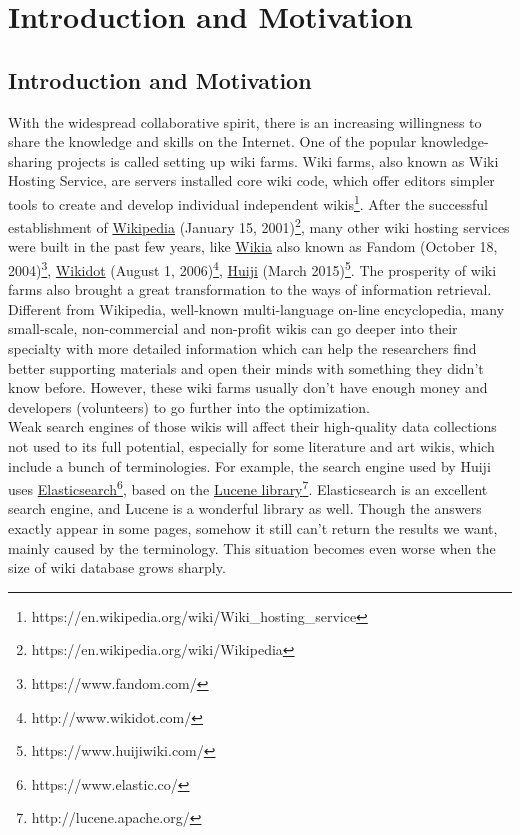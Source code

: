 \chapter{Introduction and Motivation}
\label{Ch-1:Sec:Introduction}
\section{Introduction and Motivation}
\vspace{-5pt}
With the widespread collaborative spirit, there is an increasing willingness to share the knowledge and skills on the Internet. One of the popular knowledge-sharing projects is called setting up wiki farms. Wiki farms, also known as Wiki Hosting Service, are servers installed core wiki code, which offer editors simpler tools to create and develop individual independent wikis\footnote{https://en.wikipedia.org/wiki/Wiki\_hosting\_service}. After the successful establishment of \href{https://en.wikipedia.org/wiki/Wikipedia}{Wikipedia} (January 15, 2001)\footnote{https://en.wikipedia.org/wiki/Wikipedia}, many other wiki hosting services were built in the past few years, like \href{https://www.fandom.com/}{Wikia} also known as Fandom (October 18, 2004)\footnote{https://www.fandom.com/}, \href{http://www.wikidot.com/}{Wikidot} (August 1, 2006)\footnote{http://www.wikidot.com/}, \href{https://www.huijiwiki.com/}{Huiji} (March 2015)\footnote{https://www.huijiwiki.com/}. The prosperity of wiki farms also brought a great transformation to the ways of information retrieval.\\
\indent Different from Wikipedia, well-known multi-language on-line encyclopedia, many small-scale, non-commercial and non-profit wikis can go deeper into their specialty with more detailed information which can help the researchers find better supporting materials and open their minds with something they didn't know before. However, these wiki farms usually don't have enough money and developers (volunteers) to go further into the optimization.\\
\indent Weak search engines of those wikis will affect their high-quality data collections not used to its full potential, especially for some literature and art wikis, which include a bunch of terminologies. For example, the search engine used by Huiji uses \href{https://www.elastic.co/}{Elasticsearch}\footnote{https://www.elastic.co/}, based on the \href{http://lucene.apache.org/}{Lucene library}\footnote{http://lucene.apache.org/}. Elasticsearch is an excellent search engine, and Lucene is a wonderful library as well. Though the answers exactly appear in some pages, somehow it still can't return the results we want, mainly caused by the terminology. This situation becomes even worse when the size of wiki database grows sharply. \\

